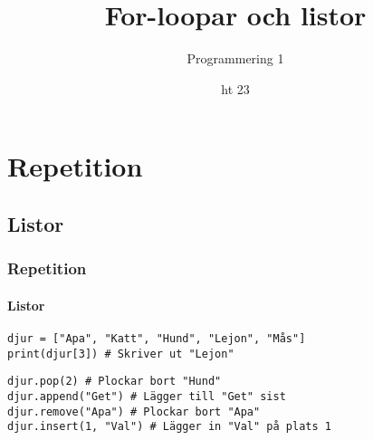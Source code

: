 \documentclass[aspectratio=169]{beamer}
\begin{document}


\title{For-loopar och listor}
\date{ht 23}
\author{Programmering 1}

\maketitle

\section{Repetition}

\subsection{Listor}

\begin{frame}[fragile]
	\frametitle{Repetition}
	\framesubtitle{Listor}
	
	\begin{lstlisting}
djur = ["Apa", "Katt", "Hund", "Lejon", "Mås"]
print(djur[3]) # Skriver ut "Lejon"
	\end{lstlisting}
	
	\pause
	
	\begin{lstlisting}
djur.pop(2) # Plockar bort "Hund"
djur.append("Get") # Lägger till "Get" sist
djur.remove("Apa") # Plockar bort "Apa"
djur.insert(1, "Val") # Lägger in "Val" på plats 1
	\end{lstlisting}
	
	
\end{frame}
\end{document}
